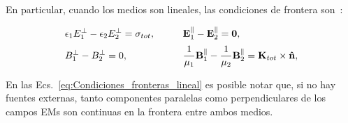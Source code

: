 % 
En particular, cuando los medios son lineales, las condiciones de frontera son~\cite{Griffiths}:
\begin{tcolorbox}[title = Condiciones de frontera para materiales lineales]
\begin{equation}
\begin{aligned}
&\epsilon_{1}E_{1}^{\perp}-\epsilon_{2}E_{2}^{\perp}=\sigma_{tot},&\qquad&\vb{E}_{1}^{\parallel}-\vb{E}_{2}^{\parallel}=\vb{0},\\[2pt]
&B_{1}^{\perp}-B_{2}^{\perp}=0,&\qquad& \frac{1}{\mu_{1}}\vb{B}^{\parallel}_{1}-\frac{1}{\mu_{2}}\vb{B}^{\parallel}_{2}=\vb{K}_{tot}\times\vu{n},
\end{aligned}\label{eq:Condiciones_fronteras_lineal}
\end{equation}
\end{tcolorbox}
En las Ecs.~\eqref{eq:Condiciones_fronteras_lineal} es posible notar que, si no hay fuentes externas, tanto componentes paralelas como perpendiculares de los campos EMs son continuas en la frontera entre ambos medios.

